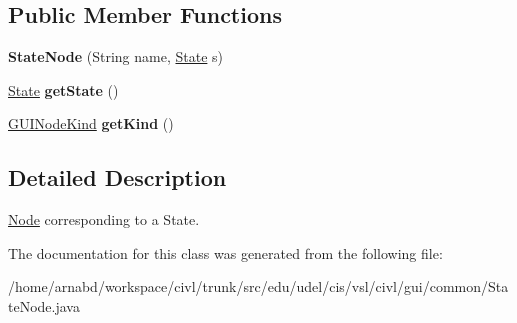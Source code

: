 \subsection*{Public Member Functions}
\begin{DoxyCompactItemize}
\item 
\hypertarget{classedu_1_1udel_1_1cis_1_1vsl_1_1civl_1_1gui_1_1common_1_1StateNode_a69c96a16e87e632c8b87788ee38f3f71}{}{\bfseries State\+Node} (String name, \hyperlink{interfaceedu_1_1udel_1_1cis_1_1vsl_1_1civl_1_1state_1_1IF_1_1State}{State} s)\label{classedu_1_1udel_1_1cis_1_1vsl_1_1civl_1_1gui_1_1common_1_1StateNode_a69c96a16e87e632c8b87788ee38f3f71}

\item 
\hypertarget{classedu_1_1udel_1_1cis_1_1vsl_1_1civl_1_1gui_1_1common_1_1StateNode_a7277347ed324774fcf15ab1724cc9c5c}{}\hyperlink{interfaceedu_1_1udel_1_1cis_1_1vsl_1_1civl_1_1state_1_1IF_1_1State}{State} {\bfseries get\+State} ()\label{classedu_1_1udel_1_1cis_1_1vsl_1_1civl_1_1gui_1_1common_1_1StateNode_a7277347ed324774fcf15ab1724cc9c5c}

\item 
\hypertarget{classedu_1_1udel_1_1cis_1_1vsl_1_1civl_1_1gui_1_1common_1_1StateNode_aca3669ae19473e0f18e434a7178720a6}{}\hyperlink{enumedu_1_1udel_1_1cis_1_1vsl_1_1civl_1_1gui_1_1common_1_1GUINODE_1_1GUINodeKind}{G\+U\+I\+Node\+Kind} {\bfseries get\+Kind} ()\label{classedu_1_1udel_1_1cis_1_1vsl_1_1civl_1_1gui_1_1common_1_1StateNode_aca3669ae19473e0f18e434a7178720a6}

\end{DoxyCompactItemize}


\subsection{Detailed Description}
\hyperlink{structNode}{Node} corresponding to a State. 

The documentation for this class was generated from the following file\+:\begin{DoxyCompactItemize}
\item 
/home/arnabd/workspace/civl/trunk/src/edu/udel/cis/vsl/civl/gui/common/State\+Node.\+java\end{DoxyCompactItemize}
